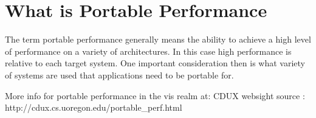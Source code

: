 \section{What is Portable Performance}

The term portable performance generally means the ability to achieve a high level of performance on a variety of architectures.
%
In this case high performance is relative to each target system.
%
One important consideration then is what variety of systems are used that applications need to be portable for. \cite{michaelwolfe2016}
%

%
More info for portable performance in the vis realm at: 
CDUX websight source : http://cdux.cs.uoregon.edu/portable_perf.html


